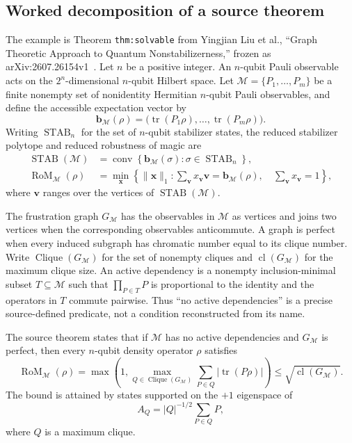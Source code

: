 \subsection{Worked decomposition of a source theorem}

The example is Theorem \texttt{thm:solvable} from Yingjian Liu et al., ``Graph Theoretic Approach to Quantum Nonstabilizerness,'' frozen as arXiv:2607.26154v1~\cite{liu2026graph}. Let $n$ be a positive integer. An $n$-qubit Pauli observable acts on the $2^n$-dimensional $n$-qubit Hilbert space. Let $\mathcal{M}=\{P_1,\ldots,P_m\}$ be a finite nonempty set of nonidentity Hermitian $n$-qubit Pauli observables, and define the accessible expectation vector by
\begin{equation}
\boldsymbol{b}_{\mathcal{M}}(\rho)
=
\bigl(\operatorname{tr}(P_1\rho),\ldots,\operatorname{tr}(P_m\rho)\bigr).
\end{equation}
Writing $\operatorname{STAB}_n$ for the set of $n$-qubit stabilizer states, the reduced stabilizer polytope and reduced robustness of magic are
\begin{align}
\operatorname{STAB}(\mathcal{M})
&=
\operatorname{conv}\!\left\{\boldsymbol{b}_{\mathcal{M}}(\sigma):
\sigma\in\operatorname{STAB}_n\right\},\\
\operatorname{RoM}_{\mathcal{M}}(\rho)
&=
\min_{\boldsymbol{x}}
\left\{\lVert\boldsymbol{x}\rVert_1:
\sum_{\boldsymbol{v}}x_{\boldsymbol{v}}\boldsymbol{v}
=\boldsymbol{b}_{\mathcal{M}}(\rho),\quad
\sum_{\boldsymbol{v}}x_{\boldsymbol{v}}=1\right\},
\end{align}
where $\boldsymbol{v}$ ranges over the vertices of $\operatorname{STAB}(\mathcal{M})$.

The frustration graph $G_{\mathcal{M}}$ has the observables in $\mathcal{M}$ as vertices and joins two vertices when the corresponding observables anticommute. A graph is perfect when every induced subgraph has chromatic number equal to its clique number. Write $\operatorname{Clique}(G_{\mathcal{M}})$ for the set of nonempty cliques and $\operatorname{cl}(G_{\mathcal{M}})$ for the maximum clique size. An active dependency is a nonempty inclusion-minimal subset $T\subseteq\mathcal{M}$ such that $\prod_{P\in T}P$ is proportional to the identity and the operators in $T$ commute pairwise. Thus ``no active dependencies'' is a precise source-defined predicate, not a condition reconstructed from its name.

The source theorem states that if $\mathcal{M}$ has no active dependencies and $G_{\mathcal{M}}$ is perfect, then every $n$-qubit density operator $\rho$ satisfies
\begin{equation}
\operatorname{RoM}_{\mathcal{M}}(\rho)
=
\max\left(1,
\max_{Q\in\operatorname{Clique}(G_{\mathcal{M}})}
\sum_{P\in Q}
\left|\operatorname{tr}(P\rho)\right|\right)
\leq
\sqrt{\operatorname{cl}(G_{\mathcal{M}})}.
\label{eq:rom-perfect-graph}
\end{equation}
The bound is attained by states supported on the $+1$ eigenspace of
\begin{equation}
A_Q
=
\lvert Q\rvert^{-1/2}\sum_{P\in Q}P,
\label{eq:maximum-clique-operator}
\end{equation}
where $Q$ is a maximum clique.


